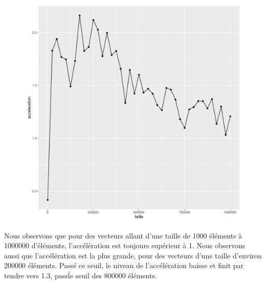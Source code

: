 \documentclass[a4paper,11pt]{scrartcl}
\begin{document}
\begin{figure}[H] \center
   \includegraphics[scale=0.5] {graphes/global_temps_machine_accel5.png}
\end{figure}

Nous observons que pour des vecteurs allant d'une taille de 1000 \'el\'ements \`a 1000000 d'\'el\'ements, l'acc\'el\'eration est toujours sup\'erieur \`a 1. Nous observons aussi que l'acc\'el\'eration est la plus grande, pour des vecteurs d'une taille d'environ 200000 \'el\'ements. Pass\'e ce seuil, le niveau de l'acc\'el\'eration baisse et finit par tendre vers 1.3, pass\' le seuil des 800000 \'el\'ements.   
\end{document}
